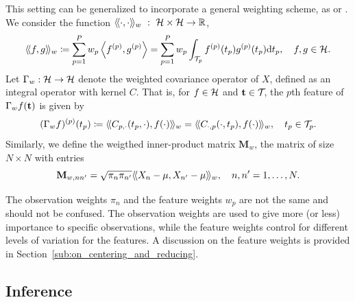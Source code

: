 This setting can be generalized to incorporate a general weighting scheme, as \cite{chiouMultivariateFunctionalPrincipal2014} or \cite{happMultivariateFunctionalPrincipal2018a}. We consider the function $\langle\!\langle\cdot, \cdot\rangle\!\rangle_w~:~\mathcal{H} \times \mathcal{H} \rightarrow \mathbb{R}$,
\begin{equation}\label{eq:innerprodH_weight}
    \langle\!\langle f, g\rangle\!\rangle_w \coloneqq \sum_{p=1}^{P} w_p\left\langle f^{(p)}, g^{(p)}\right\rangle = \sum_{p=1}^{P}w_p\int_{\mathcal{T}_{p}} f^{(p)}(t_p)g^{(p)}(t_p) {\rm d} t_p, \quad f, g \in \mathcal{H}.
\end{equation}
Let $\Gamma_w : \mathcal{H} \rightarrow \mathcal{H}$ denote the weighted covariance operator of $X$, defined as an integral operator with kernel $C$. That is, for $f \in \mathcal{H}$ and $\mathbf{t} \in \mathcal{T}_{}$, the $p$th feature of $\Gamma_w f(\mathbf{t})$ is given by
\begin{equation}\label{eq:covariance_operator_components_weight}
    (\Gamma_w f)^{(p)}(t_p) \coloneqq \langle\!\langle C_{p, \cdot}(t_p, \cdot), f(\cdot)\rangle\!\rangle_w = \langle\!\langle C_{\cdot, p}(\cdot, t_p), f(\cdot)\rangle\!\rangle_w, \quad t_p \in \mathcal{T}_{p}.
\end{equation}
Similarly, we define the weigthed inner-product matrix $\mathbf{M}_w$, the matrix of size $N \times N$ with entries
\begin{equation}\label{eq:gram_mat_weights}
    \mathbf{M}_{w, nn^\prime} = \sqrt{\pi_n \pi_{n^{\prime}}}\langle\!\langle X_n - \mu, X_{n^\prime} - \mu\rangle\!\rangle_w, \quad n, n^\prime = 1, \dots, N.
\end{equation}
\begin{remark}
The observation weights $\pi_n$ and the feature weights $w_p$ are not the same and should not be confused. The observation weights are used to give more (or less) importance to specific observations, while the feature weights control for different levels of variation for the features. A discussion on the feature weights is provided in Section~\ref{sub:on_centering_and_reducing}.    
\end{remark}


\subsection{Inference} %
\label{sub:inference}

